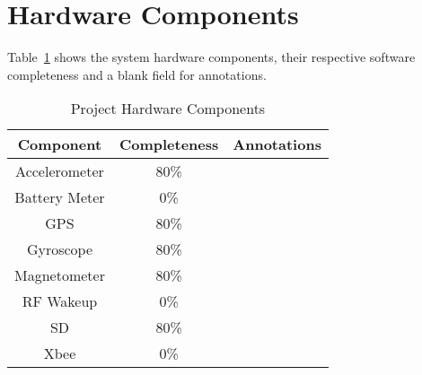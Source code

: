 \section{Hardware Components}
Table~\ref{tab:hwComp} shows the system hardware components, their respective software completeness and a blank field for annotations.


    \begin{table}[H]
    \centering
    \caption{Project Hardware Components}
    \begin{tabular}{|c|c|c|}
    \hline
    \rowcolor{Gray}
    Component & Completeness & Annotations \\ 
    \hline \hline   
        Accelerometer & 80\%  &  \\ \hline
        Battery Meter & 0\%   &  \\ \hline
        GPS   & 80\%   &  \\ \hline
        Gyroscope & 80\%   &  \\ \hline
        Magnetometer & 80\%   &  \\ \hline
        RF Wakeup & 0\%   &  \\ \hline
        SD & 80\%  &  \\ \hline
        Xbee  & 0\%   &  \\ \hline
        \end{tabular}%
    \label{tab:hwComp}%
    \end{table}

